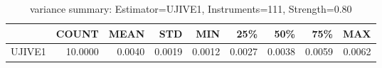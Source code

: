 \begin{table}[ht]
\centering
\caption{variance summary: Estimator=UJIVE1, Instruments=111, Strength=0.80}
\begin{tabular}{lrrrrrrrr}
\toprule
 & COUNT & MEAN & STD & MIN & 25\% & 50\% & 75\% & MAX \\
\midrule
UJIVE1 & 10.0000 & 0.0040 & 0.0019 & 0.0012 & 0.0027 & 0.0038 & 0.0059 & 0.0062 \\
\bottomrule
\end{tabular}
\end{table}

